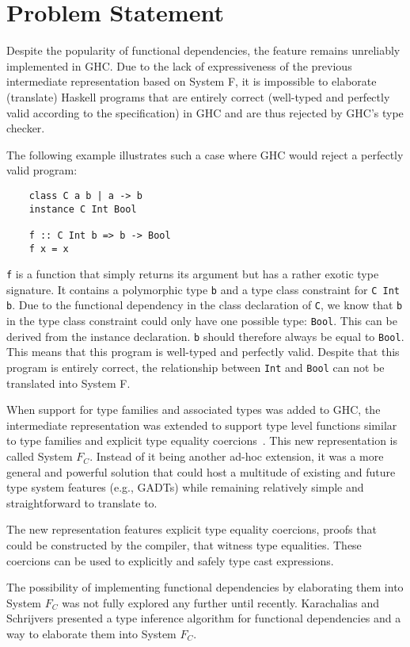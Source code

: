 \section{Problem Statement}
\label{sec:problem-statement}
Despite the popularity of functional dependencies, the feature remains unreliably
implemented in GHC. Due to the lack of expressiveness of the previous intermediate
representation based on System F, it is impossible to elaborate (translate)
Haskell programs that are entirely correct (well-typed and perfectly valid
according to the specification) in GHC and are thus rejected by GHC's type checker.

The following example illustrates such a case where GHC would reject a perfectly
valid program:
\begin{verbatim}
    class C a b | a -> b
    instance C Int Bool

    f :: C Int b => b -> Bool
    f x = x
\end{verbatim}
%
\texttt{f} is a function that simply returns its argument but has a rather
exotic type signature. It contains a polymorphic type \texttt{b} and a type
class constraint for \texttt{C Int b}. Due to the functional dependency in the
class declaration of \texttt{C}, we know that \texttt{b} in the type class
constraint could only have one possible type: \texttt{Bool}. This can be
derived from the instance declaration. \texttt{b} should therefore always be
equal to \texttt{Bool}. This means that this program is well-typed and perfectly
valid. Despite that this program is entirely correct, the relationship between
\texttt{Int} and \texttt{Bool} can not be translated into System F.

When support for type families and associated types was added to GHC, the
intermediate representation was extended to support type level functions similar
to type families and explicit type equality coercions~\cite{Sulzmann:2007:SFT:1190315.1190324}. This new representation
is called System $F_C$. Instead of it being another ad-hoc extension, it was a
more general and powerful solution that could host a multitude of existing and
future type system features (e.g., GADTs) while remaining relatively simple
and straightforward to translate to.

The new representation features explicit type equality coercions, proofs that
could be constructed by the compiler, that witness type equalities. These
coercions can be used to explicitly and safely type cast expressions.

The possibility of implementing functional dependencies by elaborating them into
System $F_C$ was not fully explored any further until recently. Karachalias and
Schrijvers\cite{Karachalias:2017:EFD:3156695.3122966} presented a type
inference algorithm for functional dependencies and a way to elaborate them into
System $F_C$.

